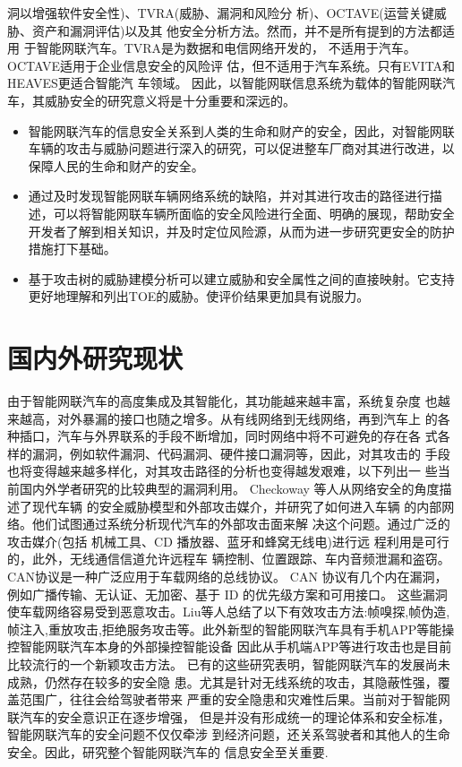 洞以增强软件安全性)、TVRA(威胁、漏洞和风险分
析)、OCTAVE(运营关键威胁、资产和漏洞评估)以及其
他安全分析方法。然而，并不是所有提到的方法都适用
于智能网联汽车。TVRA是为数据和电信网络开发的，
不适用于汽车。OCTAVE适用于企业信息安全的风险评
估，但不适用于汽车系统。只有EVITA和HEAVES更适合智能汽
车领域。
\newline
因此，以智能网联信息系统为载体的智能网联汽车，其威胁安全的研究意义将是十分重要和深远的。
\newline
\begin{itemize}
  \item 智能网联汽车的信息安全关系到人类的生命和财产的安全，因此，对智能网联车辆的攻击与威胁问题进行深入的研究，可以促进整车厂商对其进行改进，以保障人民的生命和财产的安全。
  \item 通过及时发现智能网联车辆网络系统的缺陷，并对其进行攻击的路径进行描述，可以将智能网联车辆所面临的安全风险进行全面、明确的展现，帮助安全开发者了解到相关知识，并及时定位风险源，从而为进一步研究更安全的防护措施打下基础。
  \item 基于攻击树的威胁建模分析可以建立威胁和安全属性之间的直接映射。它支持更好地理解和列出TOE的威胁。使评价结果更加具有说服力。
\end{itemize}
\section{国内外研究现状}
由于智能网联汽车的高度集成及其智能化，其功能越来越丰富，系统复杂度
也越来越高，对外暴漏的接口也随之增多。从有线网络到无线网络，再到汽车上
的各种插口，汽车与外界联系的手段不断增加，同时网络中将不可避免的存在各
式各样的漏洞，例如软件漏洞、代码漏洞、硬件接口漏洞等，因此，对其攻击的
手段也将变得越来越多样化，对其攻击路径的分析也变得越发艰难，以下列出一
些当前国内外学者研究的比较典型的漏洞利用。
\newline
Checkoway 等人从网络安全的角度描述了现代车辆
的安全威胁模型和外部攻击媒介，并研究了如何进入车辆
的内部网络。他们试图通过系统分析现代汽车的外部攻击面来解
决这个问题。通过广泛的攻击媒介(包括
机械工具、CD 播放器、蓝牙和蜂窝无线电)进行远
程利用是可行的，此外，无线通信信道允许远程车
辆控制、位置跟踪、车内音频泄漏和盗窃。
CAN协议是一种广泛应用于车载网络的总线协议。
CAN 协议有几个内在漏洞，例如广播传输、无认证、无加密、基于 ID 的优先级方案和可用接口。
这些漏洞使车载网络容易受到恶意攻击。Liu等人总结了以下有效攻击方法:帧嗅探,帧伪造,
帧注入,重放攻击,拒绝服务攻击等。此外新型的智能网联汽车具有手机APP等能操控智能网联汽车本身的外部操控智能设备
因此从手机端APP等进行攻击也是目前比较流行的一个新颖攻击方法。
\newline
已有的这些研究表明，智能网联汽车的发展尚未成熟，仍然存在较多的安全隐
患。尤其是针对无线系统的攻击，其隐蔽性强，覆盖范围广，往往会给驾驶者带来
严重的安全隐患和灾难性后果。当前对于智能网联汽车的安全意识正在逐步增强，
但是并没有形成统一的理论体系和安全标准，智能网联汽车的安全问题不仅仅牵涉
到经济问题，还关系驾驶者和其他人的生命安全。因此，研究整个智能网联汽车的
信息安全至关重要.
